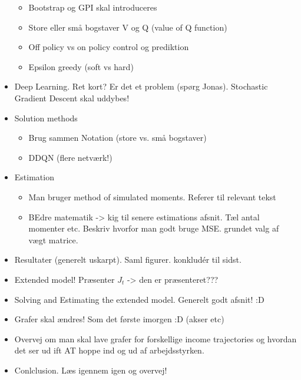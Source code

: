 \documentclass{article}
\begin{document}
\begin{itemize}
\begin{itemize}
        \item Bootstrap og GPI skal introduceres
        \item Store eller små bogstaver V og Q (value of Q function)
        \item Off policy vs on policy control og prediktion
        \item Epsilon greedy (soft vs hard)
    \end{itemize}
    \item Deep Learning. Ret kort? Er det et problem (spørg Jonas). Stochastic Gradient Descent skal uddybes!
    \item Solution methods
    \begin{itemize}
        \item Brug sammen Notation (store vs. små bogstaver)
        \item DDQN (flere netværk!)
    \end{itemize}
    \item Estimation 
    \begin{itemize}
        \item Man bruger method of simulated moments. Referer til relevant tekst
        \item BEdre matematik -> kig til senere estimations afsnit. Tæl antal momenter etc. Beskriv hvorfor man godt bruge MSE. grundet valg af vægt matrice.
    \end{itemize}
    \item Resultater (generelt uskarpt). Saml figurer. konkludér til sidst.
    \item Extended model! Præsenter $J_t$ -> den er præsenteret???
    \item Solving and Estimating the extended model. Generelt godt afsnit! :D
    \item Grafer skal ændres! Som det første imorgen :D (akser etc)
    \item Overvej om man skal lave grafer for forskellige income trajectories og hvordan det ser ud ift AT hoppe ind og ud af arbejdsstyrken.
    \item Conlclusion. Læs igennem igen og overvej!
\end{itemize}

\fi








\end{document}
